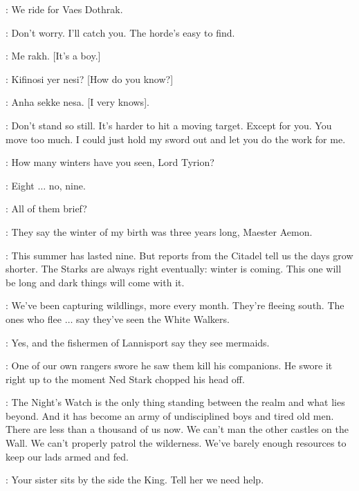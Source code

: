 \RAKHARO: We ride for Vaes Dothrak. 

\JORAH: Don't worry. I'll catch you. The horde's easy to find. 


\scene



\DAENERYS: Me rakh. [It's a boy.] 

\DROGO: Kifinosi yer nesi? [How do you know?] 

\DAENERYS: Anha sekke nesa. [I very knows].


\scene



\JON: Don't stand so still. It's harder to hit a moving target.  Except for you. You move too much. I could just hold my sword out and let you do the work for me. 

\AEMON: How many winters have you seen, Lord Tyrion? 

\TYRION: Eight $\ldots$ no, nine. 

\AEMON: All of them brief? 

\TYRION: They say the winter of my birth was three years long, Maester Aemon. 

\AEMON: This summer has lasted nine. But reports from the Citadel tell us the days grow shorter. The Starks are always right eventually: winter is coming. This one will be long and dark things will come with it. 

\JEOR: We've been capturing wildlings, more every month. They're fleeing south. The ones who flee $\ldots$ say they've seen the White Walkers. 

\TYRION: Yes, and the fishermen of Lannisport say they see mermaids. 

\JEOR: One of our own rangers swore he saw them kill his companions. He swore it right up to the moment Ned Stark chopped his head off. 

\AEMON: The Night's Watch is the only thing standing between the realm and what lies beyond. And it has become an army of undisciplined boys and tired old men. There are less than a thousand of us now. We can't man the other castles on the Wall. We can't properly patrol the wilderness. We've barely enough resources to keep our lads armed and fed. 

\JEOR: Your sister sits by the side the King. Tell her we need help. 

